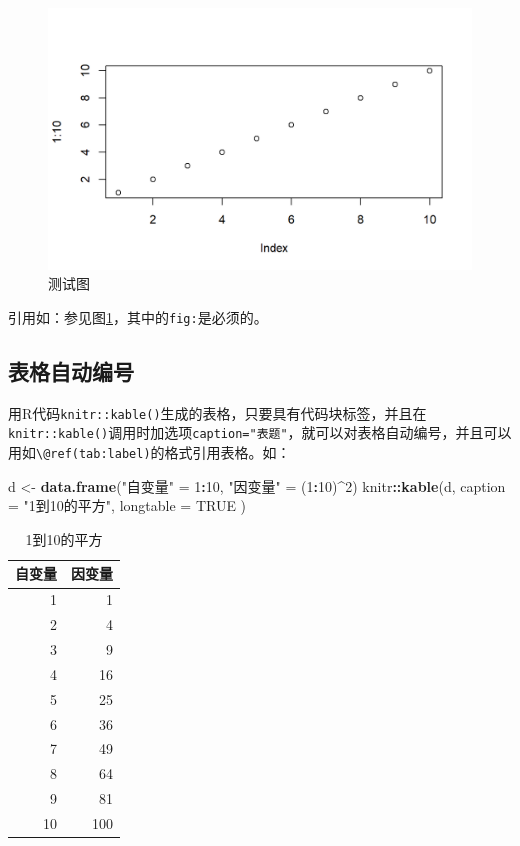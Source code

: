 \documentclass[]{article}
\newenvironment{Shaded}{\begin{snugshade}}{\end{snugshade}}
\newcommand{\DataTypeTok}[1]{\textcolor[rgb]{0.13,0.29,0.53}{#1}}
\newcommand{\DecValTok}[1]{\textcolor[rgb]{0.00,0.00,0.81}{#1}}
\newcommand{\KeywordTok}[1]{\textcolor[rgb]{0.13,0.29,0.53}{\textbf{#1}}}
\newcommand{\NormalTok}[1]{#1}
\newcommand{\OperatorTok}[1]{\textcolor[rgb]{0.81,0.36,0.00}{\textbf{#1}}}
\newcommand{\OtherTok}[1]{\textcolor[rgb]{0.56,0.35,0.01}{#1}}
\newcommand{\StringTok}[1]{\textcolor[rgb]{0.31,0.60,0.02}{#1}}
\begin{document}
\begin{figure}

{\centering \includegraphics[width=0.8\linewidth]{Figs/u-w-f-ex01-1} 

}

\caption{测试图}\label{fig:u-w-f-ex01}
\end{figure}

引用如：参见图\ref{fig:u-w-f-ex01}，其中的\texttt{fig:}是必须的。

\hypertarget{usage-writing-tab}{%
\subsection{表格自动编号}\label{usage-writing-tab}}

用R代码\texttt{knitr::kable()}生成的表格，只要具有代码块标签，并且在\texttt{knitr::kable()}调用时加选项\texttt{caption="表题"}，就可以对表格自动编号，并且可以用如\texttt{\textbackslash{}@ref(tab:label)}的格式引用表格。如：

\begin{Shaded}
\begin{Highlighting}[]
\NormalTok{d <-}\StringTok{ }\KeywordTok{data.frame}\NormalTok{(}\StringTok{"自变量"}\NormalTok{ =}\StringTok{ }\DecValTok{1}\OperatorTok{:}\DecValTok{10}\NormalTok{, }\StringTok{"因变量"}\NormalTok{ =}\StringTok{ }\NormalTok{(}\DecValTok{1}\OperatorTok{:}\DecValTok{10}\NormalTok{)}\OperatorTok{^}\DecValTok{2}\NormalTok{)}
\NormalTok{knitr}\OperatorTok{::}\KeywordTok{kable}\NormalTok{(d, }\DataTypeTok{caption =} \StringTok{"1到10的平方"}\NormalTok{, }\DataTypeTok{longtable =} \OtherTok{TRUE}\NormalTok{ )}
\end{Highlighting}
\end{Shaded}

\begin{longtable}{r|r}
\caption{\label{tab:u-w-tab-ex01}1到10的平方}\\
\hline
自变量 & 因变量\\
\hline
1 & 1\\
\hline
2 & 4\\
\hline
3 & 9\\
\hline
4 & 16\\
\hline
5 & 25\\
\hline
6 & 36\\
\hline
7 & 49\\
\hline
8 & 64\\
\hline
9 & 81\\
\hline
10 & 100\\
\hline
\end{longtable}
\end{document}
